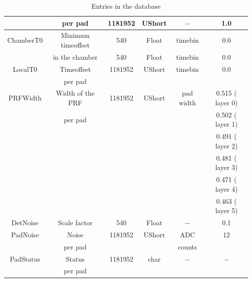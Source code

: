 \documentclass{alicetdr}
\begin{document}
\begin{table} [h]
\begin{center}
\begin{tabular}{|c|c|c|c|c|c|}
                                        &  per pad                                           & 1181952           & UShort     & $-$ & 1.0  \\ \hline
      ChamberT0                         & Minimum timeoffset                                 & 540               & Float      & timebin  & 0.0   \\ 
                                        & in the chamber                                        & 540               & Float      & timebin  & 0.0   \\ \hline
      LocalT0                           & Timeoffset                                         & 1181952           & UShort     & timebin & 0.0  \\ 
                                        & per pad                                            &                   &            &  &   \\ \hline
      PRFWidth                          & Width of the PRF                                   & 1181952           & UShort     & pad width &  0.515 ( layer 0) \\
      $ $                               & per pad                                            & $ $               & $ $        & $ $       &  0.502 ( layer 1) \\
      $ $                               & $ $                                                & $ $               & $ $        & $ $       &  0.491 ( layer 2) \\
      $ $                               & $ $                                                & $ $               & $ $        & $ $       &  0.481 ( layer 3) \\
      $ $                               & $ $                                                & $ $               & $ $        & $ $       &  0.471 ( layer 4) \\
      $ $                               & $ $                                                & $ $               & $ $        & $ $       &  0.463 ( layer 5) \\ \hline
      DetNoise                          & Scale factor                                       & 540               & Float      & $-$ & 0.1  \\ \hline
      PadNoise                          & Noise                                              & 1181952           & UShort     & ADC  & 12  \\ 
                                        & per pad                                            &                   &            & counts &   \\ \hline
      PadStatus                         & Status                                             & 1181952           & char       & $-$  & $-$   \\ 
                                        & per pad                                            &                   &            &  &   \\ \hline
    \end{tabular}
  \end{center}
\caption{\label{entriesdatabase}Entries in the database}
\end{table}
\end{document}
